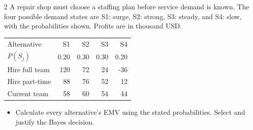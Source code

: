 \begin{multicols}{2}\raggedcolumns
{}
A repair shop must choose a staffing plan before service demand is known. The four possible demand states are S1: surge, S2: strong, S3: steady, and S4: slow, with the probabilities shown. Profits are in thousand USD.
\begin{center}\small\setlength{\tabcolsep}{4pt}
\begin{tabular}{@{}lrrrr@{}}\toprule
Alternative&S1&S2&S3&S4\\
$P(S_j)$&0.20&0.30&0.30&0.20\\\midrule
Hire full team&120&72&24&-36\\
Hire part-time&88&76&52&12\\
Current team&58&60&54&44\\\bottomrule
\end{tabular}\end{center}
\begin{itemize}\item[\textbf{(C6)}] Calculate every alternative's EMV using the stated probabilities. Select and justify the Bayes decision. \end{itemize}


\end{multicols}
